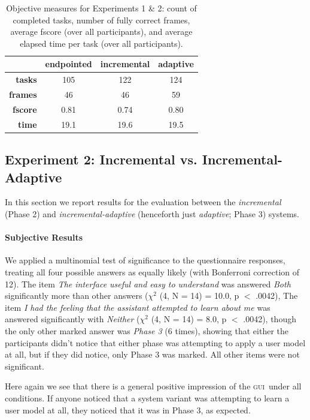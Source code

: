 \documentclass[11pt]{article}
\newcommand{\ui}[0]{\textsc{gui}}
\begin{document}
\begin{table}
 \begin{tabular}{|r|c|c|c|}
\hline
                     & \textbf{endpointed} & \textbf{incremental} & \textbf{adaptive} \\
\hline
\textbf{tasks} & 105 & 122 & 124  \\
\textbf{frames} & 46 & 46 & 59 \\
\textbf{fscore} & 0.81 & 0.74 & 0.80 \\
\textbf{time} & 19.1 & 19.6 & 19.5 \\
 \hline
\end{tabular}
\caption{Objective measures for Experiments 1 \& 2: count of completed tasks, number of fully correct frames, average fscore (over all participants), and average elapsed time per task (over all participants).}
\label{tab:objscores}
\end{table}

\subsection{Experiment 2: Incremental vs. Incremental-Adaptive}
\label{section:exp2}

In this section we report results for the evaluation between the \emph{incremental} (Phase 2) and \emph{incremental-adaptive} (henceforth just \emph{adaptive}; Phase 3) systems. 

\paragraph{Subjective Results}  We applied a multinomial test of significance to the questionnaire responses, treating all four possible answers as equally likely (with Bonferroni correction of 12). The item \emph{The interface useful and easy to understand} was answered \emph{Both} significantly more than other answers  ($ \chi^2 $ (4, N = 14) = 10.0, p $<$ .0042), The item \emph{I had the feeling that the assistant attempted to learn about me} was answered significantly with \emph{Neither} ($ \chi^2 $ (4, N = 14) = 8.0, p $<$ .0042), though the only other marked answer was \emph{Phase 3} (6 times), showing that either the participants didn't notice that either phase was attempting to apply a user model at all, but if they did notice, only Phase 3 was marked. All other items were not significant.

Here again we see that there is a general positive impression of the \ui\ under all conditions. If anyone noticed that a system variant was attempting to learn a user model at all, they noticed that it was in Phase 3, as expected. 
\end{document}

